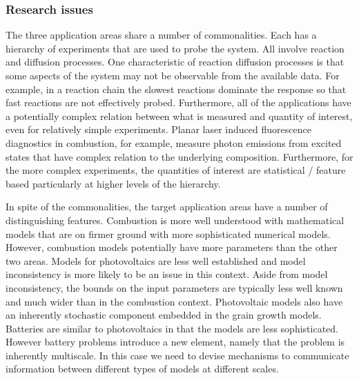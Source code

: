 \documentclass[11pt]{article}
\begin{document}
\subsubsection*{Research issues}
The three application areas share a number of commonalities.
Each has a hierarchy of experiments that are used to probe the system.
All involve reaction and diffusion processes.
One characteristic of reaction diffusion processes is that some aspects of the system
may not be observable from the available data. For example, in a reaction chain the slowest
reactions dominate the response so that fast reactions are not effectively probed.
Furthermore, all of the applications
have a potentially complex relation between what is measured and quantity of interest,
even for relatively simple experiments. 
Planar laser induced fluorescence diagnostics in combustion, for example, 
measure photon emissions from excited states that have complex relation to the underlying
composition.
Furthermore, for the more complex experiments, the
quantities of interest are statistical / feature based
particularly at higher levels of the hierarchy.

In spite of the commonalities, the target application areas have a number
of distinguishing features.
Combustion is more well understood with mathematical models that are on firmer ground
with more sophisticated numerical models.
However, combustion models potentially have more parameters than the other two areas.
Models for photovoltaics are less well established and
model inconsistency is more likely to be an issue in this context.
Aside from model inconsistency, the bounds on the input parameters are typically less well known and much wider than in the combustion context. 
Photovoltaic models also have an inherently stochastic component
embedded in  the grain growth models.  
Batteries are similar to photovoltaics
in that the models are less sophisticated. However battery problems introduce a 
new element, namely that the problem is inherently multiscale.
In this case we need to devise mechanisms to communicate information
between different types of models at different scales.
\end{document}
